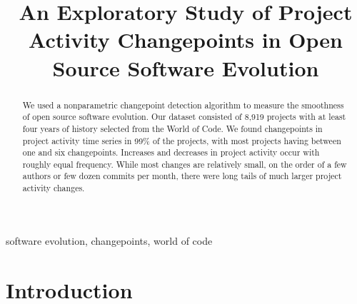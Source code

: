 \documentclass[10pt,conference]{IEEEtran}
\begin{document}
\title{An Exploratory Study of Project Activity Changepoints in Open Source Software Evolution}

\author{
\and
{}
\and
{}
}
\maketitle

\begin{abstract}
We used a nonparametric changepoint detection algorithm to measure the smoothness of open source software evolution. Our dataset consisted of 8,919 projects with at least four years of history selected from the World of Code.
We found changepoints in project activity time series in 99\% of the projects, with most projects having between one and six changepoints. Increases and decreases in project activity occur with roughly equal frequency. While most changes are relatively small, on the order of a few authors or few dozen commits per month, there were long tails of much larger project activity changes.
\end{abstract}

\begin{IEEEkeywords}
software evolution, changepoints, world of code
\end{IEEEkeywords}

\section{Introduction}
\end{document}

